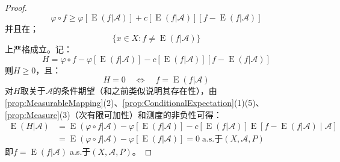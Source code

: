 \begin{proof}
\begin{equation*}
		\varphi\circ f\geqslant\varphi[\operatorname{E}(f|\mathscr{A})]+c[\operatorname{E}(f|\mathscr{A})][f-\operatorname{E}(f|\mathscr{A})]
	\end{equation*}
	并且在；
	\begin{equation*}
		\{x\in X:f\ne\operatorname{E}(f|\mathscr{A})\}
	\end{equation*}
	上严格成立。记：
	\begin{equation*}
		H=\varphi\circ f-\varphi[\operatorname{E}(f|\mathscr{A})]-c[\operatorname{E}(f|\mathscr{A})][f-\operatorname{E}(f|\mathscr{A})]
	\end{equation*}
	则$H\geqslant 0$，且：
	\begin{equation*}
		H=0\quad\Longleftrightarrow\quad f=\operatorname{E}(f|\mathscr{A})
	\end{equation*}
	对$H$取关于$\mathscr{A}$的条件期望（和之前类似说明其存在性），由\cref{prop:MeasurableMapping}(2)、\cref{prop:ConditionalExpectation}(1)(5)、\cref{prop:Measure}(3)（次有限可加性）和测度的非负性可得：
	\begin{align*}
		\operatorname{E}(H|\mathscr{A})&=\operatorname{E}(\varphi\circ f|\mathscr{A})-\varphi[\operatorname{E}(f|\mathscr{A})]-c[\operatorname{E}(f|\mathscr{A})]\operatorname{E}[f-\operatorname{E}(f|\mathscr{A})\mid\mathscr{A}] \\
		&=\operatorname{E}(\varphi\circ f|\mathscr{A})-\varphi[\operatorname{E}(f|\mathscr{A})]=0\;\text{a.s.于}(X,\mathscr{A},P)
	\end{align*}
	即$f=\operatorname{E}(f|\mathscr{A})\;$a.s.于$(X,\mathscr{A},P)$。
\end{proof}

